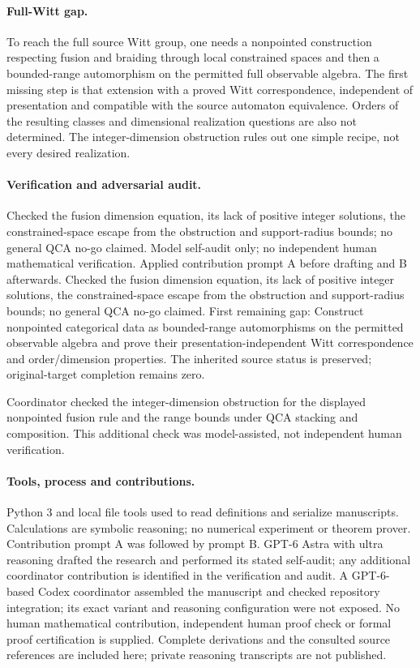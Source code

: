 \documentclass[11pt]{article}
\begin{document}
\paragraph{Full-Witt gap.} To reach the full source Witt group, one needs a nonpointed construction respecting fusion and braiding through local constrained spaces and then a bounded-range automorphism on the permitted full observable algebra. The first missing step is that extension with a proved Witt correspondence, independent of presentation and compatible with the source automaton equivalence. Orders of the resulting classes and dimensional realization questions are also not determined. The integer-dimension obstruction rules out one simple recipe, not every desired realization.

\paragraph{Verification and adversarial audit.}
Checked the fusion dimension equation, its lack of positive integer solutions, the constrained-space escape from the obstruction and support-radius bounds; no general QCA no-go claimed. Model self-audit only; no independent human mathematical verification. Applied contribution prompt A before drafting and B afterwards. Checked the fusion dimension equation, its lack of positive integer solutions, the constrained-space escape from the obstruction and support-radius bounds; no general QCA no-go claimed. First remaining gap: Construct nonpointed categorical data as bounded-range automorphisms on the permitted observable algebra and prove their presentation-independent Witt correspondence and order/dimension properties. The inherited source status is preserved; original-target completion remains zero.

Coordinator checked the integer-dimension obstruction for the displayed nonpointed fusion rule and the range bounds under QCA stacking and composition. This additional check was model-assisted, not independent human verification.

\paragraph{Tools, process and contributions.}
Python 3 and local file tools used to read definitions and serialize manuscripts. Calculations are symbolic reasoning; no numerical experiment or theorem prover. Contribution prompt A was followed by prompt B. GPT-6 Astra with ultra reasoning drafted the research and performed its stated self-audit; any additional coordinator contribution is identified in the verification and audit. A GPT-6-based Codex coordinator assembled the manuscript and checked repository integration; its exact variant and reasoning configuration were not exposed. No human mathematical contribution, independent human proof check or formal proof certification is supplied. Complete derivations and the consulted source references are included here; private reasoning transcripts are not published.
\end{document}
